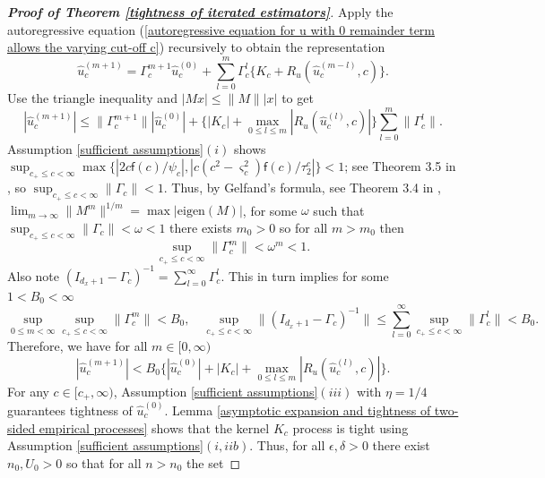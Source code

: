 \documentclass[11pt, letterpaper]{article}
\numberwithin{algorithm}{section}
\numberwithin{assumption}{section}
\numberwithin{lemma}{section}
\numberwithin{theorem}{section}
\numberwithin{corollary}{section}
\numberwithin{remark}{section}
\numberwithin{equation}{section}
\numberwithin{figure}{section}
\numberwithin{table}{section}
\begin{document}
\begin{proof}[\textnormal{\textbf{Proof of Theorem \ref{tightness of iterated estimators}}}]
Apply the autoregressive equation (\ref{autoregressive equation for u with 0 remainder term allows the varying cut-off c}) recursively to obtain the representation
\begin{equation} \label{recursive representation for u with 0 remainder term allows the varying cut-off c}
\widehat{u}_{c}^{(m+1)} = \Gamma_{c}^{m+1} \widehat{u}_{c}^{(0)} + \sum_{l=0}^{m} \Gamma_{c}^{l} \{ K_{c} + R_{u}(\widehat{u}_{c}^{(m-l)}, c) \}.
\end{equation}
Use the triangle inequality and $|Mx| \le \| M \| |x|$ to get
\begin{equation*}
|\widehat{u}_{c}^{(m+1)}| \le \| \Gamma_{c}^{m+1} \| |\widehat{u}_{c}^{(0)}| + \{ | K_{c} | + \max_{0 \le l \le m} |R_{u}(\widehat{u}_{c}^{(l)}, c)| \} \sum_{l=0}^{m} \| \Gamma_{c}^{l} \|.
\end{equation*}
Assumption \ref{sufficient assumptions}$(i)$ shows $\sup_{c_{+} \le c < \infty} \max \{ |2c\mathsf{f}(c)/\psi_{c}|, |c(c^{2} - \varsigma_{c}^{2})\mathsf{f}(c)/\tau_{2}^{c}| \} < 1$; see Theorem 3.5 in \cite{johansen2013outlier}, so $\sup_{c_{+} \le c < \infty} \| \Gamma_{c} \| < 1$. Thus, by Gelfand's formula, see Theorem 3.4 in \cite{varga2000matrix}, $\lim_{m \to \infty} \| M^{m} \|^{1/m} = \max | \mathrm{eigen}(M) |$, for some $\omega$ such that $\sup_{c_{+} \le c < \infty} \| \Gamma_{c} \| < \omega < 1$ there exists $m_{0} > 0$ so for all $m > m_{0}$ then
\begin{equation} \label{one strong inequality by Gelfand's formula}
\sup_{c_{+} \le c < \infty} \| \Gamma_{c}^{m} \| < \omega^{m} < 1.
\end{equation}
Also note $(I_{d_{x} + 1} - \Gamma_{c})^{-1} = \sum_{l=0}^{\infty} \Gamma_{c}^{l}$. This in turn implies for some $1 < B_{0} < \infty$
\begin{equation} \label{two weak inequalities by Gelfand's formula}
\sup_{0 \le m < \infty} \sup_{c_{+} \le c < \infty} \| \Gamma_{c}^{m} \| < B_{0}, \quad \sup_{c_{+} \le c < \infty} \| (I_{d_{x} + 1} - \Gamma_{c})^{-1} \|  \le \sum_{l=0}^{\infty} \sup_{c_{+} \le c < \infty} \| \Gamma_{c}^{l} \| < B_{0}.
\end{equation}
Therefore, we have for all $m \in [0, \infty)$
\begin{equation} \label{inequality for recursive equation after Gelfand formula}
|\widehat{u}_{c}^{(m+1)}| < B_{0} \{ |\widehat{u}_{c}^{(0)}| + |K_{c}| + \max_{0 \le l \le m} |R_{u}(\widehat{u}_{c}^{(l)}, c)| \}.
\end{equation}
For any $c \in [c_{+}, \infty)$, Assumption \ref{sufficient assumptions}$(iii)$ with $\eta = 1/4$ guarantees tightness of $\widehat{u}_{c}^{(0)}$. Lemma \ref{asymptotic expansion and tightness of two-sided empirical processes} shows that the kernel $K_{c}$ process is tight using Assumption \ref{sufficient assumptions}$(i, iib)$. Thus, for all $\epsilon, \delta > 0$ there exist $n_{0}, U_{0} > 0$ so that for all $n > n_{0}$ the set

\end{proof}
\end{document}
